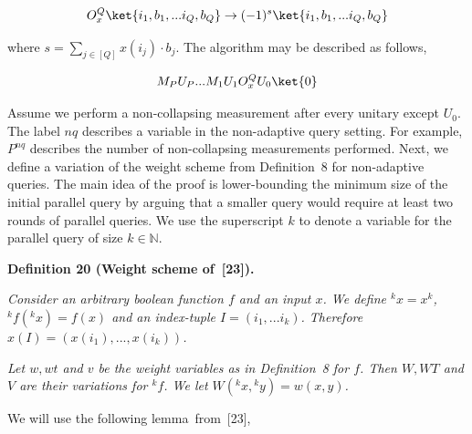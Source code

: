 \[\begin{gathered}
\displaystyle O_{x}^{Q}\ket{i_{1},b_{1},...i_{Q},b_{Q}}\rightarrow(-1)^{s}\ket{i_{1},b_{1},...i_{Q},b_{Q}}
\end{gathered}\]




where $s=\sum_{j\in[Q]}x(i_{j})\cdot b_{j}$. The algorithm may be described as follows,\par


\[\begin{gathered}
\displaystyle M_{P}U_{P}...M_{1}U_{1}O_{x}^{Q}U_{0}\ket{0}
\end{gathered}\]




Assume we perform a non-collapsing measurement after every unitary except $U_{0}$. The label $nq$ describes a variable in the non-adaptive query setting. For example, $P^{nq}$ describes the number of non-collapsing measurements performed. Next, we define a variation of the weight scheme from Definition 8 for non-adaptive queries. The main idea of the proof is lower-bounding the minimum size of the initial parallel query by arguing that a smaller query would require at least two rounds of parallel queries. We use the superscript $k$ to denote a variable for the parallel query of size $k\in\mathbb{N}$.\par





\par\medskip\noindent\textbf{
\textbf{Definition 20}\textbf{ }(Weight scheme of [23])\textbf{.}
}\par



\emph{Consider an arbitrary boolean function $f$ and an input $x$. We define ${}^{k}x=x^{k}$, ${}^{k}f({}^{k}x)=f(x)$ and an index-tuple $I=(i_{1},...i_{k})$. Therefore $x(I)=(x(i_{1}),...,x(i_{k}))$.}\par




\emph{Let $w,wt$ and $v$ be the weight variables as in Definition 8 for $f$. Then $W,WT$ and $V$ are their variations for ${}^{k}f$. We let $W({}^{k}x,{}^{k}y)=w(x,y)$.}\par






We will use the following lemma from [23],\par



